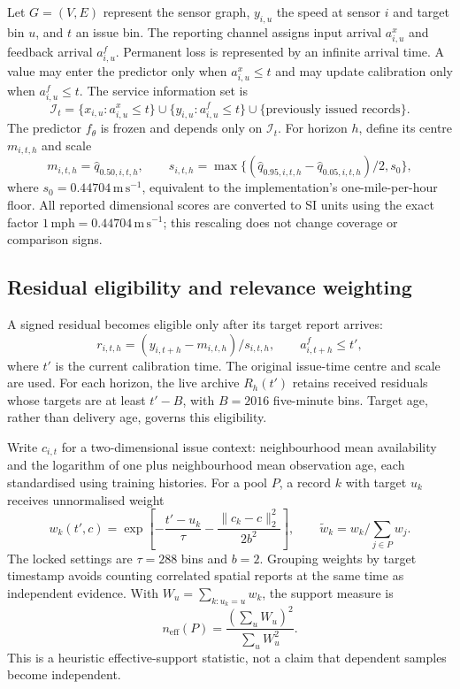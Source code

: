 \documentclass[pdflatex,sn-mathphys-num]{sn-jnl}
\newcommand{\ms}{\mathrm{m\,s^{-1}}}
\begin{document}
Let $G=(V,E)$ represent the sensor graph, $y_{i,u}$ the speed at sensor $i$ and target bin $u$, and $t$ an issue bin. The reporting channel assigns input arrival $a^x_{i,u}$ and feedback arrival $a^f_{i,u}$. Permanent loss is represented by an infinite arrival time. A value may enter the predictor only when $a^x_{i,u}\le t$ and may update calibration only when $a^f_{i,u}\le t$. The service information set is
\begin{equation}
\mathcal I_t=\{x_{i,u}:a^x_{i,u}\le t\}\cup\{y_{i,u}:a^f_{i,u}\le t\}\cup\{\text{previously issued records}\}.
\label{eq:information}
\end{equation}
The predictor $f_\theta$ is frozen and depends only on $\mathcal I_t$. For horizon $h$, define its centre $m_{i,t,h}$ and scale
\begin{equation}
m_{i,t,h}=\widehat q_{0.50,i,t,h},\qquad
s_{i,t,h}=\max\{(\widehat q_{0.95,i,t,h}-\widehat q_{0.05,i,t,h})/2,s_0\},
\label{eq:scale}
\end{equation}
where $s_0=0.44704\,\ms$, equivalent to the implementation's one-mile-per-hour floor. All reported dimensional scores are converted to SI units using the exact factor $1\,\mathrm{mph}=0.44704\,\ms$; this rescaling does not change coverage or comparison signs.

\subsection{Residual eligibility and relevance weighting}
A signed residual becomes eligible only after its target report arrives:
\begin{equation}
r_{i,t,h}=(y_{i,t+h}-m_{i,t,h})/s_{i,t,h},\qquad a^f_{i,t+h}\le t',
\end{equation}
where $t'$ is the current calibration time. The original issue-time centre and scale are used. For each horizon, the live archive $R_h(t')$ retains received residuals whose targets are at least $t'-B$, with $B=2016$ five-minute bins. Target age, rather than delivery age, governs this eligibility.

Write $c_{i,t}$ for a two-dimensional issue context: neighbourhood mean availability and the logarithm of one plus neighbourhood mean observation age, each standardised using training histories. For a pool $P$, a record $k$ with target $u_k$ receives unnormalised weight
\begin{equation}
w_k(t',c)=\exp\left[-\frac{t'-u_k}{\tau}-\frac{\|c_k-c\|_2^2}{2b^2}\right],\qquad
\widetilde w_k=w_k/\sum_{j\in P}w_j.
\label{eq:weights}
\end{equation}
The locked settings are $\tau=288$ bins and $b=2$. Grouping weights by target timestamp avoids counting correlated spatial reports at the same time as independent evidence. With $W_u=\sum_{k:u_k=u}w_k$, the support measure is
\begin{equation}
n_{\mathrm{eff}}(P)=\frac{(\sum_u W_u)^2}{\sum_u W_u^2}.
\label{eq:ess}
\end{equation}
This is a heuristic effective-support statistic, not a claim that dependent samples become independent.
\end{document}
